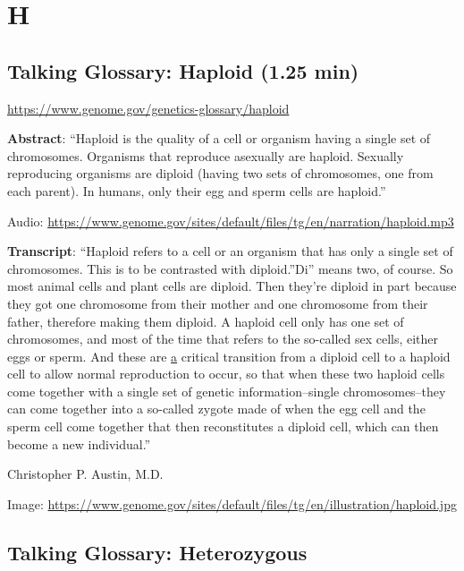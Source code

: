 \documentclass[
]{book}
\begin{document}
\hypertarget{h}{%
\chapter{H}\label{h}}

\hypertarget{talking-glossary-haploid-1.25-min}{%
\section{Talking Glossary: Haploid (1.25 min)}\label{talking-glossary-haploid-1.25-min}}

\url{https://www.genome.gov/genetics-glossary/haploid}

\textbf{Abstract}: ``Haploid is the quality of a cell or organism having a single set of chromosomes. Organisms that reproduce asexually are haploid. Sexually reproducing organisms are diploid (having two sets of chromosomes, one from each parent). In humans, only their egg and sperm cells are haploid.''

Audio: \url{https://www.genome.gov/sites/default/files/tg/en/narration/haploid.mp3}

\textbf{Transcript}: ``Haploid refers to a cell or an organism that has only a single set of chromosomes. This is to be contrasted with diploid.''Di'' means two, of course. So most animal cells and plant cells are diploid. Then they're diploid in part because they got one chromosome from their mother and one chromosome from their father, therefore making them diploid. A haploid cell only has one set of chromosomes, and most of the time that refers to the so-called sex cells, either eggs or sperm. And these are \protect\hyperlink{a}{a} critical transition from a diploid cell to a haploid cell to allow normal reproduction to occur, so that when these two haploid cells come together with a single set of genetic information--single chromosomes--they can come together into a so-called zygote made of when the egg cell and the sperm cell come together that then reconstitutes a diploid cell, which can then become a new individual.''

Christopher P. Austin, M.D.

Image: \url{https://www.genome.gov/sites/default/files/tg/en/illustration/haploid.jpg}

\hypertarget{talking-glossary-heterozygous}{%
\section{Talking Glossary: Heterozygous}\label{talking-glossary-heterozygous}}
\end{document}
